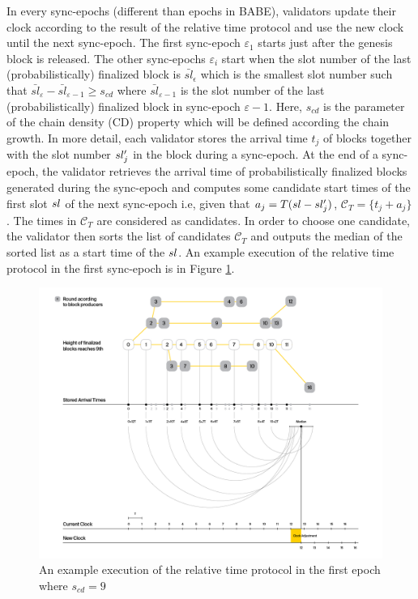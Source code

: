 In every sync-epochs (different than epochs in BABE), validators update their clock according to the result of the relative time protocol and use the new clock until the next sync-epoch. The first sync-epoch $\varepsilon_1$ starts just after the genesis block is released. The other sync-epochs  $\varepsilon_i$ start when the slot number of the last (probabilistically) finalized block is $\bar{sl}_{\epsilon}$ which is the smallest slot number such that  $\bar{sl}_{\varepsilon} - \bar{sl}_{\varepsilon-1} \geq s_{cd}$ where $\bar{sl}_{\varepsilon-1}$ is the slot number of the last (probabilistically) finalized block in sync-epoch $\varepsilon-1$. Here, $s_{cd}$ is the parameter of the chain density (CD) property which will be defined according the chain growth.
In more detail, each validator  stores  the arrival time $ t_j $ of  blocks together with the slot number $sl'_j$ in the block during a sync-epoch. At the end of a sync-epoch, the validator retrieves the arrival time of probabilistically finalized blocks generated during the sync-epoch and computes some candidate start times of the first slot $ sl $ of the next sync-epoch i.e,  given that $ a_j = T(sl - sl'_j)  $,  $\mathcal{C}_T = \{t_j+a_j \}$. The times in $ \mathcal{C}_T $ are considered as candidates. In order to  choose one candidate,  the validator then sorts the list of candidates $ \mathcal{C}_T $ and outputs the median of the sorted list as a start time of the $ sl $. An example execution of the relative time protocol in the first sync-epoch is in Figure \ref{fig:relativetime}.

\begin{figure}[h]
	\centering
	\includegraphics[width=1.\textwidth]{images/BABE3.png}
	\caption{An example execution of the relative time protocol in the first epoch where $s_{cd} = 9$}
	\label{fig:relativetime}
\end{figure}
